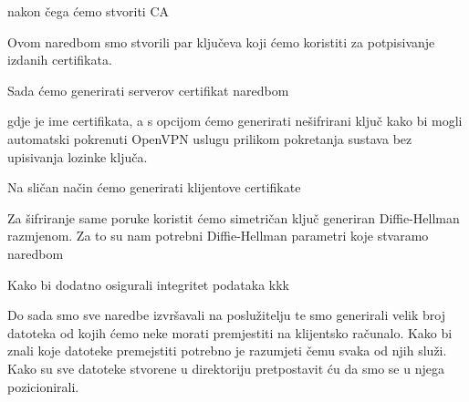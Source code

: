         
        \noindent
        nakon čega ćemo stvoriti CA 

        \noindent
        
        \noindent
        Ovom naredbom smo stvorili par ključeva koji ćemo koristiti za
        potpisivanje izdanih certifikata. 

        \noindent
        Sada ćemo generirati serverov certifikat naredbom

        \noindent

        \noindent
        gdje je  ime certifikata, a s  opcijom ćemo
        generirati nešifrirani ključ kako bi mogli automatski pokrenuti OpenVPN
        uslugu prilikom pokretanja sustava bez upisivanja lozinke ključa.

        Na sličan način ćemo generirati klijentove certifikate

        \noindent
        
        \noindent
        Za šifriranje same poruke koristit ćemo simetričan ključ generiran
        Diffie-Hellman razmjenom. Za to su nam potrebni Diffie-Hellman
        parametri koje stvaramo naredbom

        \noindent

        \noindent
        Kako bi dodatno osigurali integritet podataka kkk

        \noindent
        Do sada smo sve naredbe izvršavali na poslužitelju te smo generirali
        velik broj datoteka od kojih ćemo neke morati premjestiti na klijentsko
        računalo. Kako bi znali koje datoteke premejstiti potrebno je razumjeti
        čemu svaka od njih služi. Kako su sve datoteke stvorene u 
        direktoriju pretpostavit ću da smo se u njega pozicionirali.

